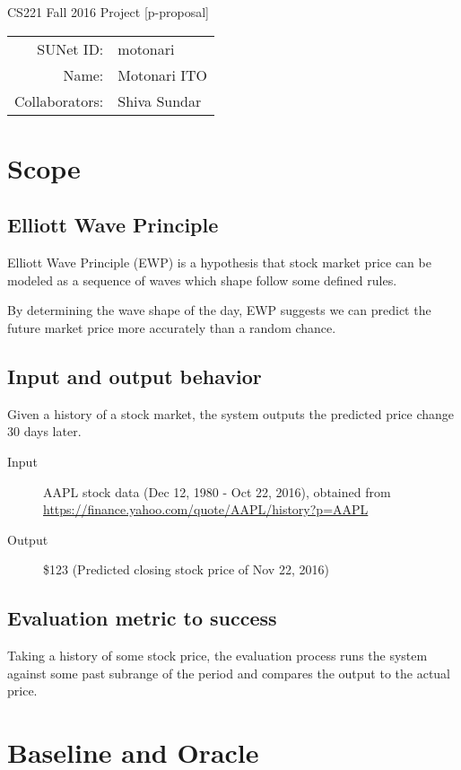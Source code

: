 \documentclass[12pt]{article}
\begin{document}
\begin{center}
{\Large CS221 Fall 2016 Project [p-proposal]}

\begin{tabular}{rl}
SUNet ID: & motonari \\
Name: & Motonari ITO \\
Collaborators: & Shiva Sundar
\end{tabular}
\end{center}

\section{Scope}

\subsection{Elliott Wave Principle}

Elliott Wave Principle (EWP) is a hypothesis that stock market price
can be modeled as a sequence of waves which shape follow some defined
rules.

By determining the wave shape of the day, EWP suggests we can predict
the future market price more accurately than a random chance.

\subsection{Input and output behavior}

Given a history of a stock market, the system outputs the predicted
price change 30 days later.

\begin{description}
\item[Input] AAPL stock data (Dec 12, 1980 - Oct 22, 2016), obtained from \url{https://finance.yahoo.com/quote/AAPL/history?p=AAPL}
\item[Output] \$123 (Predicted closing stock price of Nov 22, 2016)
\end{description}

\subsection{Evaluation metric to success}

Taking a history of some stock price, the evaluation process runs the
system against some past subrange of the period and compares the
output to the actual price.
      
\section{Baseline and Oracle}
\end{document}
